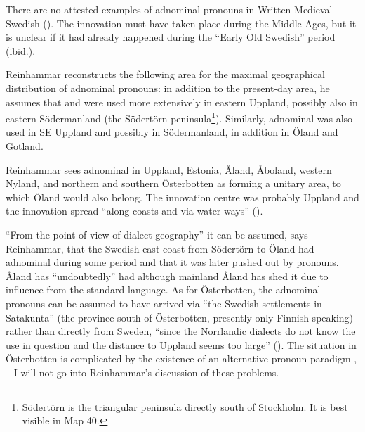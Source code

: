 
There are no attested examples of adnominal pronouns in Written Medieval Swedish (\citet[114]{Reinhammar1975}). The innovation must have taken place during the Middle Ages, but it is unclear if it had already happened during the “Early Old Swedish” period (ibid.).


Reinhammar reconstructs the following area for the maximal geographical distribution of adnominal pronouns: in addition to the present-day area, he assumes that  and  were used more extensively in eastern Uppland, possibly also in eastern Södermanland (the Södertörn peninsula\footnote{ Södertörn is the triangular peninsula directly south of Stockholm. It is best visible in Map 40.}). Similarly, adnominal was also used in SE Uppland and possibly in Södermanland, in addition in Öland and Gotland. 


Reinhammar sees adnominal in Uppland, Estonia, Åland, Åboland, western Nyland, and northern and southern Österbotten as forming a unitary area, to which Öland would also belong. The innovation centre was probably Uppland and the innovation spread “along coasts and via water-ways” (\citet[115]{Reinhammar1975}).


“From the point of view of dialect geography” it can be assumed, says Reinhammar, that the Swedish east coast from Södertörn to Öland had adnominal  during some period and that it was later pushed out by pronouns. Åland has “undoubtedly” had although mainland Åland has shed it due to influence from the standard language. As for Österbotten, the adnominal pronouns can be assumed to have arrived via “the Swedish settlements in Satakunta” (the province south of Österbotten, presently only Finnish-speaking) rather than directly from Sweden, “since the Norrlandic dialects do not know the use in question and the distance to Uppland seems too large” (\citet[116]{Reinhammar1975}). The situation in Österbotten is complicated by the existence of an alternative pronoun paradigm ,  – I will not go into Reinhammar’s discussion of these problems. 

